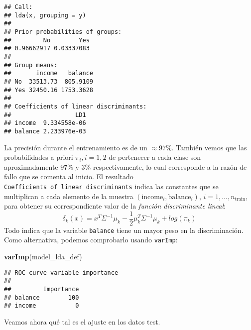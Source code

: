 \documentclass[]{book}
\newenvironment{Shaded}{\begin{snugshade}}{\end{snugshade}}
\newcommand{\CommentTok}[1]{\textcolor[rgb]{0.56,0.35,0.01}{\textit{#1}}}
\newcommand{\DataTypeTok}[1]{\textcolor[rgb]{0.13,0.29,0.53}{#1}}
\newcommand{\KeywordTok}[1]{\textcolor[rgb]{0.13,0.29,0.53}{\textbf{#1}}}
\newcommand{\NormalTok}[1]{#1}
\newcommand{\OperatorTok}[1]{\textcolor[rgb]{0.81,0.36,0.00}{\textbf{#1}}}
\newcommand{\StringTok}[1]{\textcolor[rgb]{0.31,0.60,0.02}{#1}}
\begin{document}
\begin{Shaded}
\end{Shaded}

\begin{verbatim}
## Call:
## lda(x, grouping = y)
## 
## Prior probabilities of groups:
##         No        Yes 
## 0.96662917 0.03337083 
## 
## Group means:
##       income   balance
## No  33513.73  805.9109
## Yes 32450.16 1753.3628
## 
## Coefficients of linear discriminants:
##                  LD1
## income  9.334558e-06
## balance 2.233976e-03
\end{verbatim}

La precisión durante el entrenamiento es de un \(\approx 97\%\). También vemos que las probabilidades a priori \(\pi_i, i = 1,2\) de pertenecer a cada clase son aproximadamente \(97\%\) y \(3\%\) respectivamente, lo cual corresponde a la razón de fallo que se comenta al inicio. El resultado \texttt{Coefficients\ of\ linear\ discriminants} indica las constantes que se multiplican a cada elemento de la muestra \((\text{income}_i, \text{balance}_i)\), \(i = 1, \ldots, n_{\text{train}}\), para obtener su correspondiente valor de la \emph{función discriminante lineal}:
\[ \delta_k(x) = x^T \Sigma^{-1} \mu_k  - \dfrac{1}{2} \mu_k^T \Sigma^{-1} \mu_k+ log(\pi_k) \]
Todo indica que la variable \texttt{balance} tiene un mayor peso en la discriminación. Como alternativa, podemos comprobarlo usando \texttt{varImp}:

\begin{Shaded}
\begin{Highlighting}[]
\KeywordTok{varImp}\NormalTok{(model_lda_def)}
\end{Highlighting}
\end{Shaded}

\begin{verbatim}
## ROC curve variable importance
## 
##         Importance
## balance        100
## income           0
\end{verbatim}

Veamos ahora qué tal es el ajuste en los datos test.

\begin{Shaded}
\end{Shaded}
\end{document}
